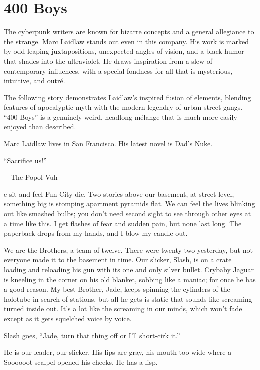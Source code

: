 \chapter{400 Boys}

The cyberpunk writers are known for bizarre concepts and a general allegiance to the strange. Marc Laidlaw stands out even in this company. His work is marked by odd leaping juxtapositions, unexpected angles of vision, and a black humor that shades into the ultraviolet. He draws inspiration from a slew of contemporary influences, with a special fondness for all that is mysterious, intuitive, and outré.

The following story demonstrates Laidlaw's inspired fusion of elements, blending features of apocalyptic myth with the modern legendry of urban street gangs. “400 Boys” is a genuinely weird, headlong mélange that is much more easily enjoyed than described.

Marc Laidlaw lives in San Francisco. His latest novel is Dad's Nuke.

\hrulefill

``Sacrifice us!''

—The Popol Vuh
 
e sit and feel Fun City die. Two stories above our basement, at street level, something big is stomping apartment pyramids flat. We can feel the lives blinking out like smashed bulbs; you don't need second sight to see through other eyes at a time like this. I get flashes of fear and sudden pain, but none last long. The paperback drops from my hands, and I blow my candle out.

We are the Brothers, a team of twelve. There were twenty-two yesterday, but not everyone made it to the basement in time. Our slicker, Slash, is on a crate loading and reloading his gun with its one and only silver bullet. Crybaby Jaguar is kneeling in the corner on his old blanket, sobbing like a maniac; for once he has a good reason. My best Brother, Jade, keeps spinning the cylinders of the holotube in search of stations, but all he gets is static that sounds like screaming turned inside out. It's a lot like the screaming in our minds, which won't fade except as it gets squelched voice by voice.

Slash goes, “Jade, turn that thing off or I'll short-cirk it.”

He is our leader, our slicker. His lips are gray, his mouth too wide where a Soooooot scalpel opened his cheeks. He has a lisp.

